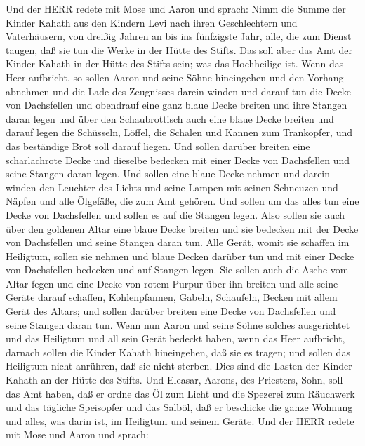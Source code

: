  Und der HERR redete mit Mose und Aaron und sprach:
 Nimm die Summe der Kinder Kahath aus den Kindern Levi nach
ihren Geschlechtern und Vaterhäusern,  von dreißig Jahren an
bis ins fünfzigste Jahr, alle, die zum Dienst taugen, daß sie tun die
Werke in der Hütte des Stifts.  Das soll aber das Amt der
Kinder Kahath in der Hütte des Stifts sein; was das Hochheilige ist.
 Wenn das Heer aufbricht, so sollen Aaron und seine Söhne
hineingehen und den Vorhang abnehmen und die Lade des Zeugnisses darein
winden  und darauf tun die Decke von Dachsfellen und
obendrauf eine ganz blaue Decke breiten und ihre Stangen daran legen
 und über den Schaubrottisch auch eine blaue Decke breiten
und darauf legen die Schüsseln, Löffel, die Schalen und Kannen zum
Trankopfer, und das beständige Brot soll darauf liegen.  Und
sollen darüber breiten eine scharlachrote Decke und dieselbe bedecken
mit einer Decke von Dachsfellen und seine Stangen daran legen.
 Und sollen eine blaue Decke nehmen und darein winden den
Leuchter des Lichts und seine Lampen mit seinen Schneuzen und Näpfen und
alle Ölgefäße, die zum Amt gehören.  Und sollen um das
alles tun eine Decke von Dachsfellen und sollen es auf die Stangen
legen.  Also sollen sie auch über den goldenen Altar eine
blaue Decke breiten und sie bedecken mit der Decke von Dachsfellen und
seine Stangen daran tun.  Alle Gerät, womit sie schaffen im
Heiligtum, sollen sie nehmen und blaue Decken darüber tun und mit einer
Decke von Dachsfellen bedecken und auf Stangen legen.  Sie
sollen auch die Asche vom Altar fegen und eine Decke von rotem Purpur
über ihn breiten  und alle seine Geräte darauf schaffen,
Kohlenpfannen, Gabeln, Schaufeln, Becken mit allem Gerät des Altars; und
sollen darüber breiten eine Decke von Dachsfellen und seine Stangen
daran tun.  Wenn nun Aaron und seine Söhne solches
ausgerichtet und das Heiligtum und all sein Gerät bedeckt haben, wenn
das Heer aufbricht, darnach sollen die Kinder Kahath hineingehen, daß
sie es tragen; und sollen das Heiligtum nicht anrühren, daß sie nicht
sterben. Dies sind die Lasten der Kinder Kahath an der Hütte des Stifts.
 Und Eleasar, Aarons, des Priesters, Sohn, soll das Amt
haben, daß er ordne das Öl zum Licht und die Spezerei zum Räuchwerk und
das tägliche Speisopfer und das Salböl, daß er beschicke die ganze
Wohnung und alles, was darin ist, im Heiligtum und seinem Geräte.
 Und der HERR redete mit Mose und Aaron und sprach:
